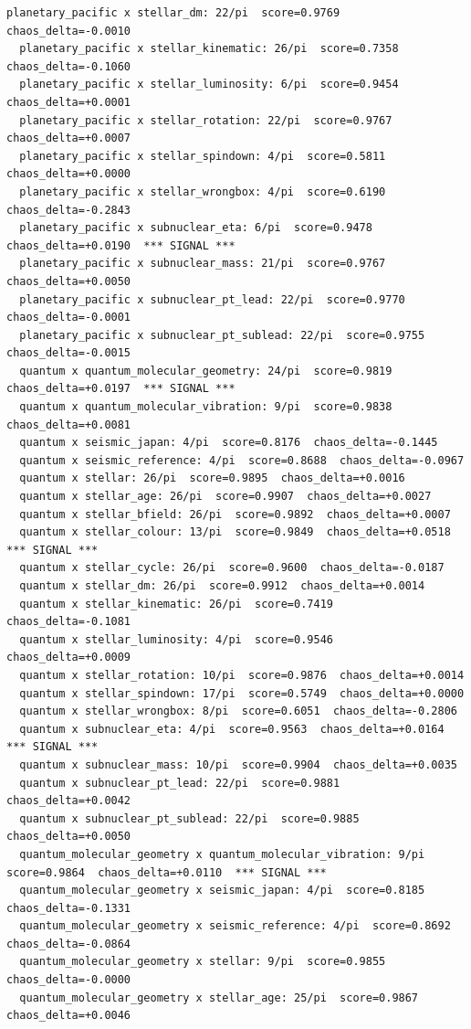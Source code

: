 \documentclass[11pt, letterpaper, openany]{book}
\begin{document}
\begin{empiricalbox}
\begin{lstlisting}[style=terminal]
  planetary_pacific x stellar_dm: 22/pi  score=0.9769  chaos_delta=-0.0010
  planetary_pacific x stellar_kinematic: 26/pi  score=0.7358  chaos_delta=-0.1060
  planetary_pacific x stellar_luminosity: 6/pi  score=0.9454  chaos_delta=+0.0001
  planetary_pacific x stellar_rotation: 22/pi  score=0.9767  chaos_delta=+0.0007
  planetary_pacific x stellar_spindown: 4/pi  score=0.5811  chaos_delta=+0.0000
  planetary_pacific x stellar_wrongbox: 4/pi  score=0.6190  chaos_delta=-0.2843
  planetary_pacific x subnuclear_eta: 6/pi  score=0.9478  chaos_delta=+0.0190  *** SIGNAL ***
  planetary_pacific x subnuclear_mass: 21/pi  score=0.9767  chaos_delta=+0.0050
  planetary_pacific x subnuclear_pt_lead: 22/pi  score=0.9770  chaos_delta=-0.0001
  planetary_pacific x subnuclear_pt_sublead: 22/pi  score=0.9755  chaos_delta=-0.0015
  quantum x quantum_molecular_geometry: 24/pi  score=0.9819  chaos_delta=+0.0197  *** SIGNAL ***
  quantum x quantum_molecular_vibration: 9/pi  score=0.9838  chaos_delta=+0.0081
  quantum x seismic_japan: 4/pi  score=0.8176  chaos_delta=-0.1445
  quantum x seismic_reference: 4/pi  score=0.8688  chaos_delta=-0.0967
  quantum x stellar: 26/pi  score=0.9895  chaos_delta=+0.0016
  quantum x stellar_age: 26/pi  score=0.9907  chaos_delta=+0.0027
  quantum x stellar_bfield: 26/pi  score=0.9892  chaos_delta=+0.0007
  quantum x stellar_colour: 13/pi  score=0.9849  chaos_delta=+0.0518  *** SIGNAL ***
  quantum x stellar_cycle: 26/pi  score=0.9600  chaos_delta=-0.0187
  quantum x stellar_dm: 26/pi  score=0.9912  chaos_delta=+0.0014
  quantum x stellar_kinematic: 26/pi  score=0.7419  chaos_delta=-0.1081
  quantum x stellar_luminosity: 4/pi  score=0.9546  chaos_delta=+0.0009
  quantum x stellar_rotation: 10/pi  score=0.9876  chaos_delta=+0.0014
  quantum x stellar_spindown: 17/pi  score=0.5749  chaos_delta=+0.0000
  quantum x stellar_wrongbox: 8/pi  score=0.6051  chaos_delta=-0.2806
  quantum x subnuclear_eta: 4/pi  score=0.9563  chaos_delta=+0.0164  *** SIGNAL ***
  quantum x subnuclear_mass: 10/pi  score=0.9904  chaos_delta=+0.0035
  quantum x subnuclear_pt_lead: 22/pi  score=0.9881  chaos_delta=+0.0042
  quantum x subnuclear_pt_sublead: 22/pi  score=0.9885  chaos_delta=+0.0050
  quantum_molecular_geometry x quantum_molecular_vibration: 9/pi  score=0.9864  chaos_delta=+0.0110  *** SIGNAL ***
  quantum_molecular_geometry x seismic_japan: 4/pi  score=0.8185  chaos_delta=-0.1331
  quantum_molecular_geometry x seismic_reference: 4/pi  score=0.8692  chaos_delta=-0.0864
  quantum_molecular_geometry x stellar: 9/pi  score=0.9855  chaos_delta=-0.0000
  quantum_molecular_geometry x stellar_age: 25/pi  score=0.9867  chaos_delta=+0.0046

\end{lstlisting}
\end{empiricalbox}
\end{document}
